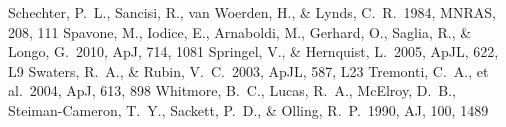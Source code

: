 \documentclass{aa}
\begin{document}
\begin{thebibliography}{}
 Schechter, P.~L.,
Sancisi, R., van Woerden, H., \& Lynds, C.~R.\ 1984, MNRAS, 208, 111
 Spavone, M., Iodice,
E., Arnaboldi, M., Gerhard, O., Saglia, R., \& Longo, G.\ 2010,
ApJ, 714, 1081
 Springel, V., \&
  Hernquist, L.\ 2005, ApJL, 622, L9
 Swaters, R.~A., \& Rubin, V.~C.\ 2003, ApJL, 587, L23
 Tremonti, C.~A., et
al.\ 2004, ApJ, 613, 898
 Whitmore, B.~C., Lucas, R.~A.,
  McElroy, D.~B., Steiman-Cameron, T.~Y., Sackett, P.~D., \& Olling,
  R.~P.\ 1990, AJ, 100, 1489





\end{thebibliography}
\end{document}
